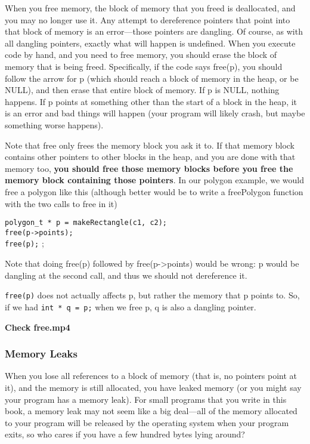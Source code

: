 \documentclass[11pt, a4paper]{article}
\begin{document}
When you free memory, the block of memory that you freed is deallocated, and you may no longer use it. Any attempt to dereference pointers that point into that block of memory is an error—those pointers are dangling. Of course, as with all dangling pointers, exactly what will happen is undefined. When you execute code by hand, and you need to free memory, you should erase the block of memory that is being freed. Specifically, if the code says free(p), you should follow the arrow for p (which should reach a block of memory in the heap, or be NULL), and then erase that entire block of memory. If p is NULL, nothing happens. If p points at something other than the start of a block in the heap, it is an error and bad things will happen (your program will likely crash, but maybe something worse happens).



Note that free only frees the memory block you ask it to. If that memory block contains other pointers to other blocks in the heap, and you are done with that memory too, \textbf{you should free those memory blocks before you free the memory block containing those pointers}. In our polygon example, we would free a polygon like this (although better would be to write a freePolygon function with the two calls to free in it)

\texttt{polygon\_t * p = makeRectangle(c1, c2);} \\
\texttt{free(p->points);} \\
\texttt{free(p);} ;


Note that doing free(p) followed by free(p->points) would be wrong: p would be dangling at the second call, and thus we should not dereference it.


\texttt{free(p)}  does not actually affects p, but rather the memory that p points to. So, if we had \texttt{int * q = p;} when we free p, q is also a dangling pointer.


\textbf{Check free.mp4}



\subsubsection{Memory Leaks}%
\label{ssub:memory_leaks}

When you lose all references to a block of memory (that is, no pointers point at it), and the memory is still allocated, you have leaked memory (or you might say your program has a memory leak). For small programs that you write in this book, a memory leak may not seem like a big deal—all of the memory allocated to your program will be released by the operating system when your program exits, so who cares if you have a few hundred bytes lying around?
\end{document}
